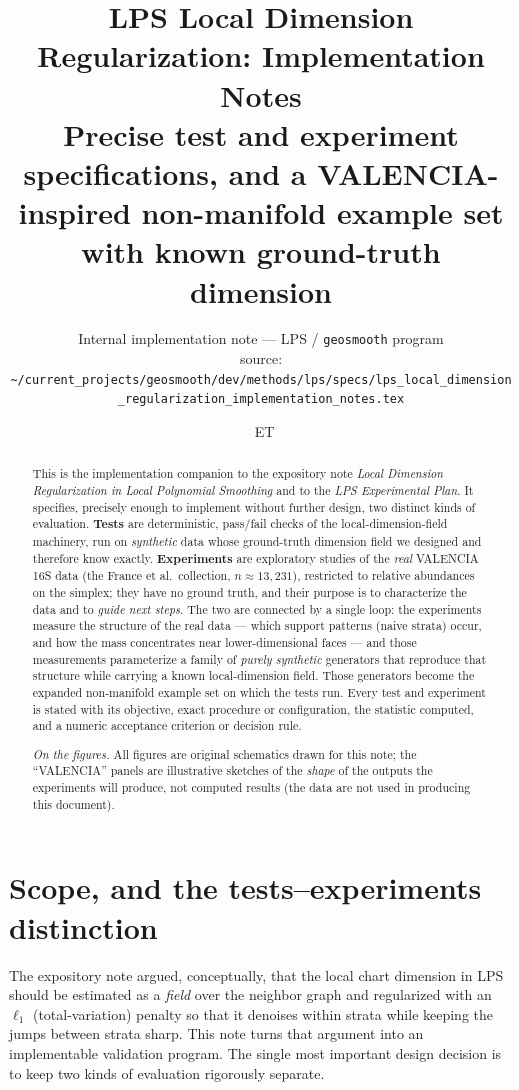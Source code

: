 \documentclass[11pt]{article}
\title{\textbf{LPS Local Dimension Regularization: Implementation Notes}\\[4pt]
\large Precise test and experiment specifications, and a VALENCIA-inspired
non-manifold example set with known ground-truth dimension}
\author{\small Internal implementation note --- LPS / \texttt{geosmooth} program\\[2pt]
\footnotesize source: \nolinkurl{~/current_projects/geosmooth/dev/methods/lps/specs/lps_local_dimension_regularization_implementation_notes.tex}}
\date{\DTMnow\ \textnormal{\footnotesize ET}}
\theoremstyle{definition}
\begin{document}
\maketitle

\begin{abstract}\noindent
This is the implementation companion to the expository note
\emph{Local Dimension Regularization in Local Polynomial Smoothing} and to the
\emph{LPS Experimental Plan}. It specifies, precisely enough to implement without
further design, two distinct kinds of evaluation. \textbf{Tests} are
deterministic, pass/fail checks of the local-dimension-field machinery, run on
\emph{synthetic} data whose ground-truth dimension field we designed and therefore
know exactly. \textbf{Experiments} are exploratory studies of the \emph{real}
VALENCIA 16S data (the France et al.\ collection, $n\approx 13{,}231$), restricted
to relative abundances on the simplex; they have no ground truth, and their
purpose is to characterize the data and to \emph{guide next steps}. The two are
connected by a single loop: the experiments measure the structure of the real
data --- which support patterns (naive strata) occur, and how the mass
concentrates near lower-dimensional faces --- and those measurements parameterize
a family of \emph{purely synthetic} generators that reproduce that structure while
carrying a known local-dimension field. Those generators become the expanded
non-manifold example set on which the tests run. Every test and experiment is
stated with its objective, exact procedure or configuration, the statistic
computed, and a numeric acceptance criterion or decision rule.
\par\medskip\noindent\footnotesize\textit{On the figures.} All figures are
original schematics drawn for this note; the ``VALENCIA'' panels are illustrative
sketches of the \emph{shape} of the outputs the experiments will produce, not
computed results (the data are not used in producing this document).
\end{abstract}

{\small\tableofcontents}

\section{Scope, and the tests--experiments distinction}\label{sec:scope}

The expository note argued, conceptually, that the local chart dimension in LPS
should be estimated as a \emph{field} over the neighbor graph and regularized with
an $\ell_1$ (total-variation) penalty so that it denoises within strata while
keeping the jumps between strata sharp. This note turns that argument into an
implementable validation program. The single most important design decision is
to keep two kinds of evaluation rigorously separate.
\end{document}
